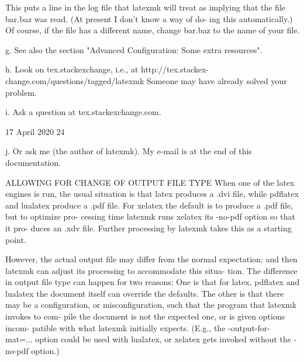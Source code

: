 
       This puts a line in the log file that latexmk will  treat  as  implying
       that  the file bar.baz was read.  (At present I don't know a way of do-
       ing this automatically.)  Of course, if the file has a different  name,
       change bar.baz to the name of your file.

       g. See also the section "Advanced Configuration: Some extra resources".

       h.    Look   on   tex.stackexchange,   i.e.,   at   http://tex.stackex-
       change.com/questions/tagged/latexmk  Someone may  have  already  solved
       your problem.

       i. Ask a question at tex.stackexchange.com.



                                 17 April 2020                              24








       j.  Or ask me (the author of latexmk).  My e-mail is at the end of this
       documentation.



ALLOWING FOR CHANGE OF OUTPUT FILE TYPE
       When one of the latex engines is run, the usual situation is that latex
       produces  a .dvi file, while pdflatex and lualatex produce a .pdf file.
       For xelatex the default is to produce a .pdf file, but to optimize pro-
       cessing  time  latexmk  runs xelatex its -no-pdf option so that it pro-
       duces an .xdv file.  Further processing by  latexmk  takes  this  as  a
       starting point.

       However, the actual output file may differ from the normal expectation;
       and then latexmk can adjust its processing to accommodate  this  situa-
       tion.   The  difference in output file type can happen for two reasons:
       One is that for latex, pdflatex and lualatex the  document  itself  can
       override  the defaults. The other is that there may be a configuration,
       or misconfiguration, such that the program that latexmk invokes to com-
       pile  the  document is not the expected one, or is given options incom-
       patible with what latexmk initially expects.  (E.g.,  the  -output-for-
       mat=...   option  could  be used with lualatex, or xelatex gets invoked
       without the -no-pdf option.)

